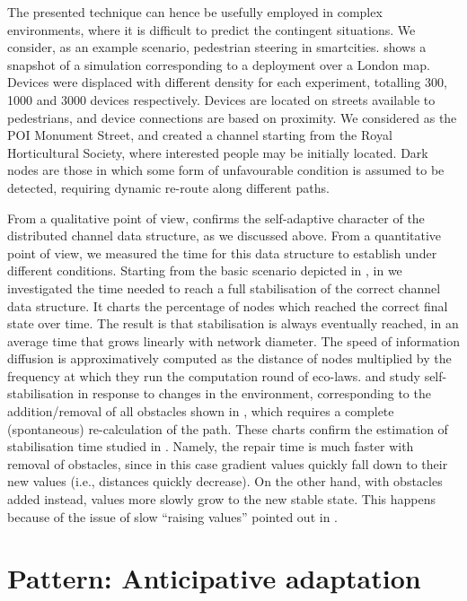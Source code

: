 \documentclass[12pt,a4paper,twoside,openright]{book}
\begin{document}
The presented technique can hence be usefully employed in complex environments, where it is difficult to predict the contingent situations.
%
We consider, as an example scenario, pedestrian steering in smartcities.
%
 shows a snapshot of a simulation corresponding to a deployment over a London map.
%
Devices were displaced with different density for each experiment, totalling 300, 1000 and 3000 devices respectively.
%
Devices are located on streets available to pedestrians, and device connections are based on proximity.
%
We considered as the POI Monument Street, and created a channel starting from the Royal Horticultural Society, where interested people may be initially located.
%
Dark nodes are those in which some form of unfavourable condition is assumed to be detected, requiring dynamic re-route along different paths.

From a qualitative point of view,  confirms the self-adaptive character of the distributed channel data structure, as we discussed above.
%
From a quantitative point of view, we measured the time for this data structure to establish under different conditions.
%
Starting from the basic scenario depicted in , in  we investigated the time needed to reach a full stabilisation of the correct channel data structure. It charts the percentage of nodes which reached the correct final state over time.
%
The result is that stabilisation is always eventually reached, in an average time that grows linearly with network diameter.
%
The speed of information diffusion is approximatively computed as the distance of nodes multiplied by the frequency at which they run the computation round of eco-laws.
%
 and  study self-stabilisation in response to changes in the environment, corresponding to the addition/removal of all obstacles shown in , which requires a complete (spontaneous) re-calculation of the path.
%
These charts confirm the estimation of stabilisation time studied in \cite{crf}.
%
Namely, the repair time is much faster with removal of obstacles, since in this case gradient values quickly fall down to their new values (i.e., distances quickly decrease).
%
On the other hand, with obstacles added instead, values more slowly grow to the new stable state.
%
This happens because of the issue of slow ``raising values'' pointed out in \cite{crf}.


\section{Pattern: Anticipative adaptation}
\label{anticipative-gradient}
\end{document}
